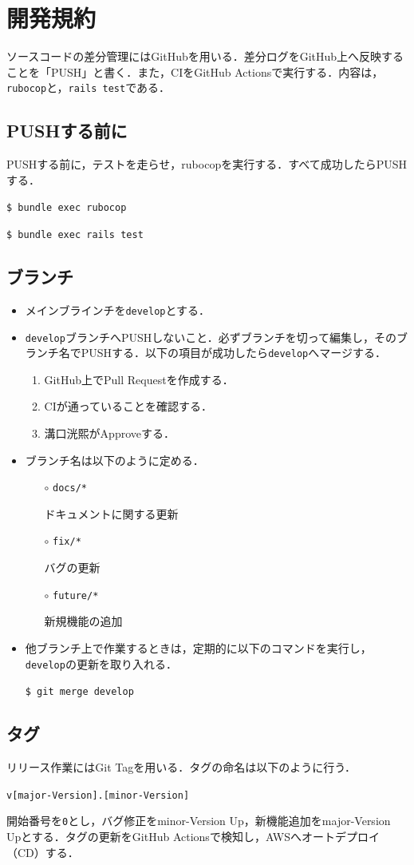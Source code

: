 \section{開発規約}\label{q3.3}
ソースコードの差分管理にはGitHubを用いる．差分ログをGitHub上へ反映することを「PUSH」と書く．また，CIをGitHub Actionsで実行する．内容は，\texttt{rubocop}と，\texttt{rails test}である．
\subsection{PUSHする前に}\label{q3.3.1}
PUSHする前に，テストを走らせ，rubocopを実行する．すべて成功したらPUSHする．
\begin{screen}
	\texttt{\$ bundle exec rubocop}

	\texttt{\$ bundle exec rails test}
\end{screen}

\subsection{ブランチ}\label{q3.3.2}
\begin{itemize}
	\item メインブラインチを\texttt{develop}とする．

	\item \texttt{develop}ブランチへPUSHしないこと．必ずブランチを切って編集し，そのブランチ名でPUSHする．以下の項目が成功したら\texttt{develop}へマージする．
	      \begin{enumerate}
		      \item GitHub上でPull Requestを作成する．
		      \item CIが通っていることを確認する．
		      \item 溝口洸熙がApproveする．
	      \end{enumerate}

	\item ブランチ名は以下のように定める．
	      \begin{itemize}
		      \item[$\circ$] \texttt{docs/*}

			      ドキュメントに関する更新
		      \item[$\circ$] \texttt{fix/*}

			      バグの更新
		      \item[$\circ$] \texttt{future/*}

			      新規機能の追加
	      \end{itemize}

	\item 他ブランチ上で作業するときは，定期的に以下のコマンドを実行し，\texttt{develop}の更新を取り入れる．
	      \begin{screen}
		      \texttt{\$ git merge develop}
	      \end{screen}
\end{itemize}

\subsection{タグ}\label{q3.3.3}
リリース作業にはGit Tagを用いる．タグの命名は以下のように行う．
\begin{screen}
	\texttt{v[major-Version].[minor-Version]}
\end{screen}

開始番号を\texttt{0}とし，バグ修正をminor-Version Up，新機能追加をmajor-Version Upとする．タグの更新をGitHub Actionsで検知し，AWSへオートデプロイ（CD）する．

